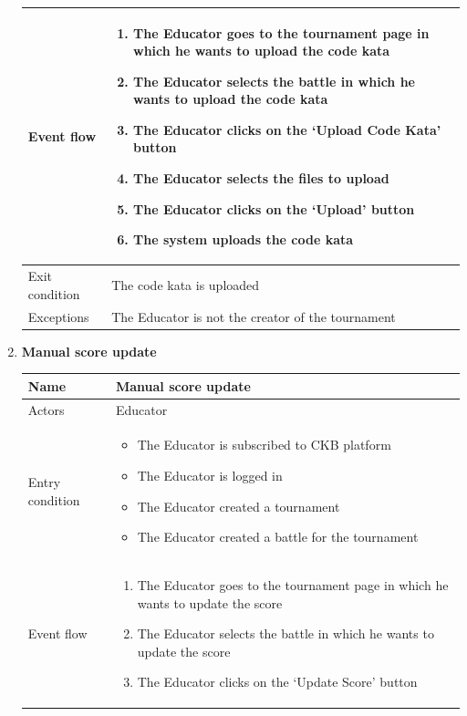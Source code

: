 \begin{enumerate}[label=UC\arabic*:]
\begin{tabular}{|p{3cm}|p{8cm}|}
        \hline
        Event flow &
        \begin{enumerate}[label=\arabic*.]
            \item The Educator goes to the tournament page in which he wants to upload the code kata
            \item The Educator selects the battle in which he wants to upload the code kata
            \item The Educator clicks on the `Upload Code Kata' button
            \item The Educator selects the files to upload
            \item The Educator clicks on the `Upload' button
            \item The system uploads the code kata
        \end{enumerate}
        \\
        \hline
        Exit condition & The code kata is uploaded \\
        \hline
        Exceptions & The Educator is not the creator of the tournament \\
        \hline
    \end{tabular}
    \item \textbf{Manual score update} \\
    \begin{tabular}{|p{3cm}|p{8cm}|}
        \hline
        Name & Manual score update \\
        \hline
        Actors & Educator \\
        \hline
        Entry condition &   
        \begin{itemize}
            \item The Educator is subscribed to CKB platform
            \item The Educator is logged in
            \item The Educator created a tournament
            \item The Educator created a battle for the tournament
        \end{itemize}
        \\
        \hline
        Event flow &
        \begin{enumerate}[label=\arabic*.]
            \item The Educator goes to the tournament page in which he wants to update the score
            \item The Educator selects the battle in which he wants to update the score
            \item The Educator clicks on the `Update Score' button

\end{enumerate}
\end{tabular}
\end{enumerate}
